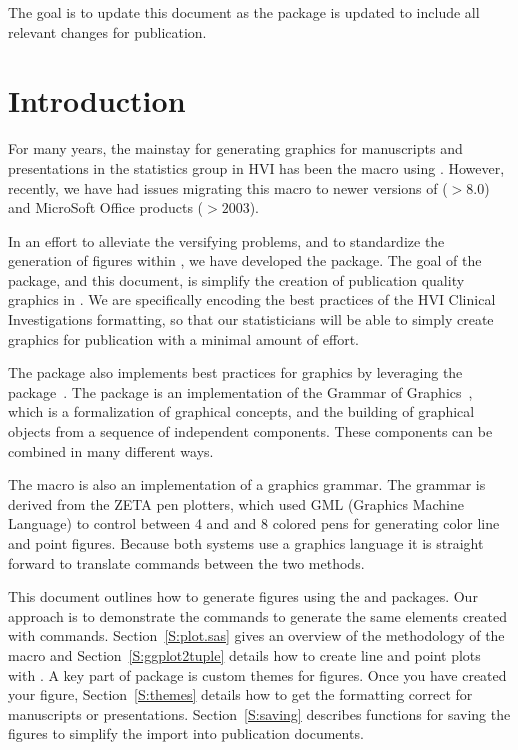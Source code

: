 \documentclass[nojss]{jss}\usepackage[]{graphicx}\usepackage[]{color}
\begin{document}
The goal is to update this document as the package is updated to include all relevant changes for publication. 

\section{Introduction}
For many years, the mainstay for generating graphics for manuscripts and presentations in the statistics group in HVI has been the  macro using . However, recently, we have had issues migrating this macro to newer versions of  ($> 8.0$) and MicroSoft Office products ($> 2003$). 

In an effort to alleviate the versifying problems, and to standardize the generation of figures within , we have developed the   package. The goal of the package, and this document, is simplify the creation of publication quality graphics in  . We are specifically encoding the best practices of the HVI Clinical Investigations formatting, so that our statisticians will be able to simply create graphics for publication with a minimal amount of effort.

The  package also implements best practices for  graphics by leveraging the  package~\citep{Wickham:2009}. The  package is an implementation of the Grammar of Graphics~\citep{Wilkinson:2005}, which is a formalization of graphical concepts, and the building of graphical objects from a sequence of independent components. These components can be combined in many different ways.

The  macro is also an implementation of a graphics grammar. The grammar is derived from the ZETA pen plotters, which used GML (Graphics Machine Language) to control between 4 and and 8 colored pens for generating color line and point figures. Because both systems use a graphics language it is straight forward to translate commands between the two methods. 

This document outlines how to generate figures using the  and  packages. Our approach is to demonstrate the  commands to generate the same elements created with  commands. Section~\ref{S:plot.sas} gives an overview of the methodology of the  macro and Section~\ref{S:ggplot2tuple} details how to create line and point plots with . A key part of  package is custom themes for figures. Once you have created your figure, Section~\ref{S:themes} details how to get the formatting correct for manuscripts or presentations. Section~\ref{S:saving} describes functions for saving the figures to simplify the import into publication documents.
\end{document}
